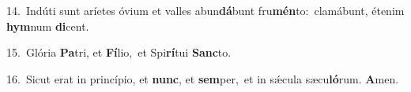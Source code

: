 {\numbfont\textcolor{\numbcolor}{14.}}~Indúti sunt aríetes óvium et valles abun\-\textbf{dá}\-bunt fru\-\textbf{mén}\-to:~\star clamábunt, étenim \textbf{hym}\-num \textbf{di}\-cent.\par
{\numbfont\textcolor{\numbcolor}{15.}}~Glória \textbf{Pa}\-tri, et \textbf{Fí}\-lio,~\star et Spi\-\textbf{rí}\-tui \textbf{Sanc}\-to.\par
{\numbfont\textcolor{\numbcolor}{16.}}~Sicut erat in princípio, et \textbf{nunc}\-, et \textbf{sem}\-per,~\star et in sǽcula sæcu\-\textbf{ló}\-rum. \textbf{A}\-men.\par

